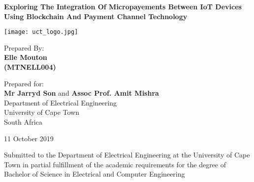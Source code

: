 \begin{titlepage}
    \begin{center}
        \vspace{1cm}
        
        \large
        \textbf{Exploring The Integration Of Micropayements Between IoT Devices Using Blockchain And Payment Channel Technology}
        
        \vspace{1cm}
        
        \texttt{[image: uct\_logo.jpg]}
        
        \vspace{1cm}
        
        \large
        Prepared By:\\ 
        \textbf{Elle Mouton}\\
        \textbf{(MTNELL004)}
        
        
        \vfill 
        Prepared for: \\
        \textbf{Mr Jarryd Son} and \textbf{Assoc Prof. Amit Mishra}\\
        Department of Electrical Engineering\\
        University of Cape Town\\
        South Africa
        
        \vspace{1.5cm}
        
        11 October 2019
        
         \vspace{1.5cm}
        Submitted to the Department of Electrical Engineering at the University of Cape Town in partial fulfillment of the academic requirements for the degree of Bachelor of Science in Electrical and Computer Engineering
        
    \end{center}
\end{titlepage}